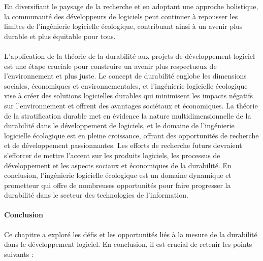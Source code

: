 En diversifiant le paysage de la recherche et en adoptant une approche holistique, la communauté des développeurs de logiciels peut continuer à repousser les limites de l'ingénierie logicielle écologique, contribuant ainsi à un avenir plus durable et plus équitable pour tous.


\paragraph{}
L'application de la théorie de la durabilité aux projets de développement logiciel est une étape cruciale pour construire un avenir plus respectueux de l'environnement et plus juste. Le concept de durabilité englobe les dimensions sociales, économiques et environnementales, et l'ingénierie logicielle écologique vise à créer des solutions logicielles durables qui minimisent les impacts négatifs sur l'environnement et offrent des avantages sociétaux et économiques. La théorie de la stratification durable met en évidence la nature multidimensionnelle de la durabilité dans le développement de logiciels, et le domaine de l'ingénierie logicielle écologique est en pleine croissance, offrant des opportunités de recherche et de développement passionnantes. Les efforts de recherche futurs devraient s'efforcer de mettre l'accent sur les produits logiciels, les processus de développement et les aspects sociaux et économiques de la durabilité. En conclusion, l'ingénierie logicielle écologique est un domaine dynamique et prometteur qui offre de nombreuses opportunités pour faire progresser la durabilité dans le secteur des technologies de l'information.


\paragraph{Conclusion}
Ce chapitre a exploré les défis et les opportunités liés à la mesure de la durabilité dans le développement logiciel. En conclusion, il est crucial de retenir les points suivants :

